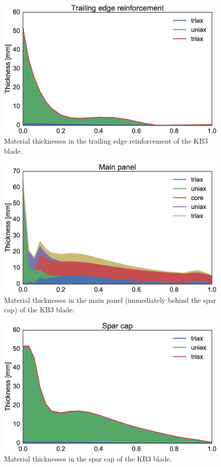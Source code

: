 \begin{figure}[!ht]
\begin{center}
	\includegraphics[width=.85\linewidth]{figures/KB3_region01.eps}
\end{center}
\caption{Material thicknesses in the trailing edge reinforcement of the KB3 blade.}
\label{fig:KB3matstackr01}
\end{figure}

\begin{figure}[!ht]
\begin{center}
	\includegraphics[width=.85\linewidth]{figures/KB3_region02.eps}
\end{center}
\caption{Material thicknesses in the main panel (immediately behind the spar cap) of the KB3 blade.}
\label{fig:KB3matstackr02}
\end{figure}

\begin{figure}[!ht]
\begin{center}
	\includegraphics[width=.85\linewidth]{figures/KB3_region04.eps}
\end{center}
\caption{Material thicknesses in the spar cap of the KB3 blade.}
\label{fig:KB3matstackr04}
\end{figure}

